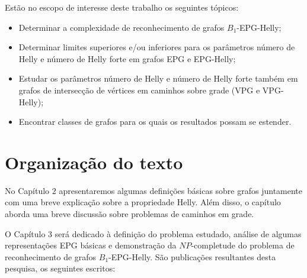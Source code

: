 Estão no escopo de interesse deste trabalho os seguintes tópicos:

\begin{itemize}
    
    \item Determinar a complexidade de reconhecimento de grafos $B_1$-EPG-Helly;
    \item Determinar limites superiores e/ou inferiores para os parâmetros número de Helly e número de Helly forte em grafos EPG e EPG-Helly;
    
    \item Estudar os parâmetros número de Helly e número de Helly forte também em grafos de intersecção de vértices em caminhos sobre grade (VPG e VPG-Helly);
    
    \item Encontrar classes de grafos para os quais os resultados possam se estender.
\end{itemize}









\section{Organização do texto}

No Capítulo 2 apresentaremos algumas definições básicas sobre grafos juntamente com uma breve explicação sobre a propriedade Helly. Além disso, o capítulo aborda uma breve discussão sobre problemas de caminhos em grade.

O Capítulo 3 será dedicado à definição do problema estudado, análise de algumas representações EPG básicas e demonstração da $NP$-completude do problema de reconhecimento de grafos $B_1$-EPG-Helly. São publicações resultantes desta pesquisa, os seguintes escritos:

